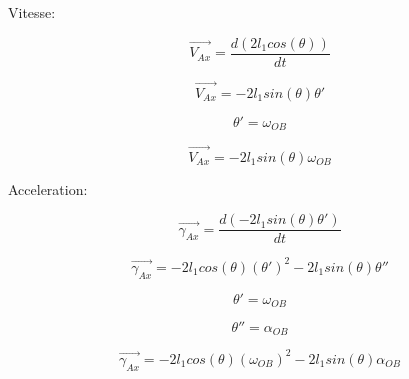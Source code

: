 \documentclass{article}
\begin{document}
\noindent Vitesse:

\begin{equation}
\overrightarrow{V_{Ax}} = \frac{d(2l_1cos(\theta))}{dt}
\end{equation}

\begin{equation}
\overrightarrow{V_{Ax}} = -2l_1sin(\theta)\theta'
\end{equation}

\begin{equation}
\theta' = \omega_{OB}
\end{equation}

\begin{equation}
\overrightarrow{V_{Ax}} = -2l_1sin(\theta)\omega_{OB}
\end{equation}

\noindent Acceleration:

\begin{equation}
\overrightarrow{\gamma_{Ax}} = \frac{d(-2l_1sin(\theta)\theta')}{dt}
\end{equation}

\begin{equation}
\overrightarrow{\gamma_{Ax}} = -2l_1cos(\theta)(\theta')^2-2l_1sin(\theta)\theta''
\end{equation}

\begin{equation}
\theta' = \omega_{OB}
\end{equation}

\begin{equation}
\theta'' = \alpha_{OB}
\end{equation}

\begin{equation}
\overrightarrow{\gamma_{Ax}} = -2l_1cos(\theta)(\omega_{OB})^2-2l_1sin(\theta)\alpha_{OB}
\end{equation}
\end{document}
